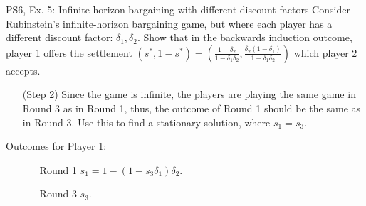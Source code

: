 \begin{frame}{PS6, Ex. 5: Infinite-horizon bargaining with different discount factors}
    Consider Rubinstein's infinite-horizon bargaining game, but where each player has a different discount factor: $\delta_1,\delta_2$. Show that in the backwards induction outcome, player 1 offers the settlement
    $(s^{*},1-s^{*})=\left( \frac{1-\delta_2}{1-\delta_1\delta_2},\frac{\delta_2(1-\delta_1)}{1-\delta_1\delta_2}\right)$
    which player 2 accepts.
    \begin{itemize}
      \item[(Step 2)] Since the game is infinite, the players are playing the same game in Round 3 as in Round 1, thus, the outcome of Round 1 should be the same as in Round 3. Use this to find a stationary solution, where $s_{1}=s_{3}$.
    \end{itemize}
    \vfill\null
  \begin{multicols}{2}
    \vfill\null \columnbreak
    Outcomes for Player 1:
    \begin{itemize}
        \item[]\vspace{-8pt}
            \begin{itemize}\normalsize
            \item[Round 1] $s_1 = 1-(1-s_3\delta_1)\delta_2$.
            \item[Round 3] $s_3$.
            \end{itemize}
    \end{itemize}
    \vfill\null
  \end{multicols}
    \vfill\null
\end{frame}
